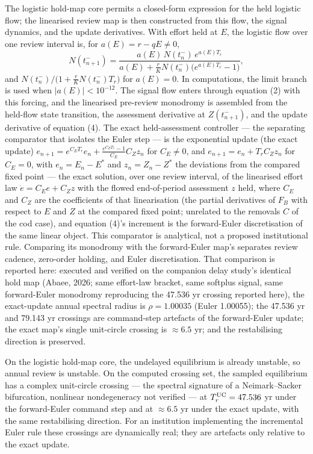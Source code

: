 \documentclass[11pt]{article}
\begin{document}
The logistic hold-map core permits a closed-form expression for the held logistic flow; the linearised review map is then constructed from this flow, the signal dynamics, and the update derivatives. With effort held at \(E\), the logistic flow over one
review interval is, for \(a(E) = r - qE \ne 0\),
\[N(t_{n+1}^-) = \frac{a(E)\,N(t_n^-)\,e^{a(E)T_r}}{a(E) + \tfrac{r}{K}N(t_n^-)\bigl(e^{a(E)T_r} - 1\bigr)},\]
and \(N(t_n^-)\big/\!\bigl(1 + \tfrac{r}{K}N(t_n^-)T_r\bigr)\) for
\(a(E) = 0\). In computations, the limit branch is used when \(|a(E)| < 10^{-12}\). The signal flow enters through equation (2) with this
forcing, and the linearised pre-review monodromy is assembled from the
held-flow state transition, the assessment derivative at
\(Z(t_{n+1}^-)\), and the update derivative of equation (4). The exact
held-assessment controller --- the separating comparator that isolates
the Euler step --- is the exponential update (the exact update)
\(e_{n+1} = e^{C_E T_r}e_n + \tfrac{e^{C_E T_r}-1}{C_E}C_Z z_n\) for
\(C_E \ne 0\), and \(e_{n+1} = e_n + T_r C_Z z_n\) for \(C_E = 0\), with
\(e_n = E_n - E^*\) and \(z_n = Z_n - Z^*\) the deviations from the compared fixed point --- the exact solution, over one review interval, of the
linearised effort law \(\dot e = C_E e + C_Z z\) with the flowed end-of-period assessment
\(z\) held, where \(C_E\) and \(C_Z\) are the coefficients of that
linearisation (the partial derivatives of \(F_B\) with respect to \(E\)
and \(Z\) at the compared fixed point; unrelated to the removals \(C\)
of the cod case), and equation (4)'s increment is the forward-Euler
discretisation of the same linear object. This comparator is analytical, not a proposed institutional rule. Comparing its monodromy with
the forward-Euler map's separates review cadence, zero-order holding,
and Euler discretisation. That comparison is reported here: executed and
verified on the companion delay study's identical hold map (Abaee, 2026; same effort-law bracket, same softplus signal, same
forward-Euler monodromy reproducing the 47.536 yr crossing reported
here), the exact-update annual spectral radius is \(\rho = 1.00035\)
(Euler 1.00055); the 47.536 yr and 79.143 yr crossings are command-step artefacts of the forward-Euler update;
the exact map's single unit-circle crossing is
\(\approx 6.5\) yr; and the restabilising direction is preserved.

On the logistic hold-map core, the undelayed equilibrium is already
unstable, so annual review is unstable. On the computed crossing set,
the sampled equilibrium has a complex unit-circle crossing --- the
spectral signature of a Neimark--Sacker bifurcation, nonlinear
nondegeneracy not verified --- at \(T_r^{\rm UC}=47.536\) yr under the
forward-Euler command step and at \(\approx 6.5\) yr under the exact update, with the same restabilising direction. For an institution implementing the incremental Euler rule these crossings are dynamically real; they are artefacts only relative to the exact update.
\end{document}
